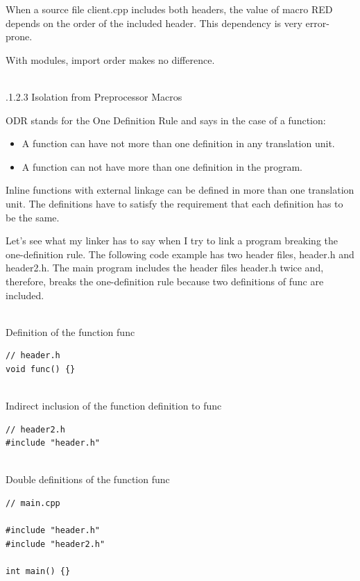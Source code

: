 When a source file client.cpp includes both headers, the value of macro RED depends on the order of the included header. This dependency is very error-prone.

With modules, import order makes no difference.

\hspace*{\fill} \\ %
.1.2.3\hspace{0.2cm} Isolation from Preprocessor Macros

ODR stands for the One Definition Rule and says in the case of a function:

\begin{itemize}
\item 
A function can have not more than one definition in any translation unit.

\item 
A function can not have more than one definition in the program.
\end{itemize}

Inline functions with external linkage can be defined in more than one translation unit. The definitions have to satisfy the requirement that each definition has to be the same.

Let’s see what my linker has to say when I try to link a program breaking the one-definition rule. The following code example has two header files, header.h and header2.h. The main program includes the header files header.h twice and, therefore, breaks the one-definition rule because two definitions of func are included.

\hspace*{\fill} \\ %
\noindent
Definition of the function func
\begin{lstlisting}[style=styleCXX]
// header.h
void func() {}
\end{lstlisting}

\hspace*{\fill} \\ %
\noindent
Indirect inclusion of the function definition to func
\begin{lstlisting}[style=styleCXX]
// header2.h
#include "header.h"
\end{lstlisting}

\hspace*{\fill} \\ %
\noindent
Double definitions of the function func
\begin{lstlisting}[style=styleCXX]
// main.cpp

#include "header.h"
#include "header2.h"

int main() {}
\end{lstlisting}

